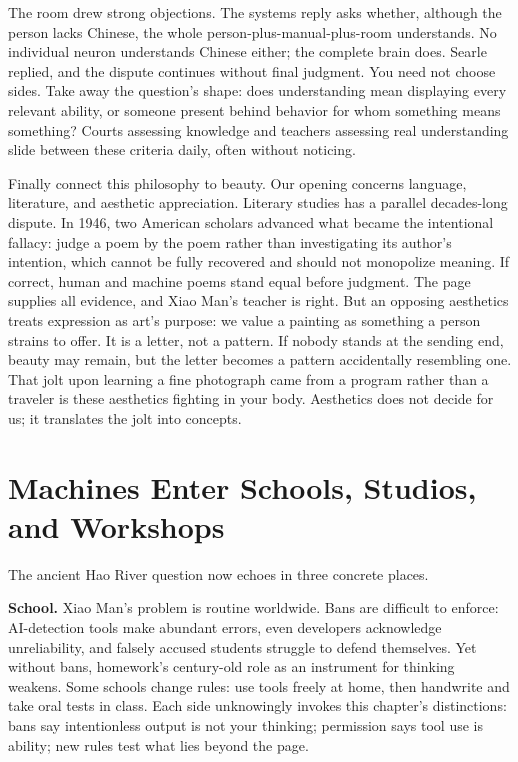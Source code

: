 The room drew strong objections. The systems reply asks whether, although the person lacks Chinese, the whole person-plus-manual-plus-room understands. No individual neuron understands Chinese either; the complete brain does. Searle replied, and the dispute continues without final judgment. You need not choose sides. Take away the question's shape: does understanding mean displaying every relevant ability, or someone present behind behavior for whom something means something? Courts assessing knowledge and teachers assessing real understanding slide between these criteria daily, often without noticing.

Finally connect this philosophy to beauty. Our opening concerns language, literature, and aesthetic appreciation. Literary studies has a parallel decades-long dispute. In 1946, two American scholars advanced what became the intentional fallacy: judge a poem by the poem rather than investigating its author's intention, which cannot be fully recovered and should not monopolize meaning. If correct, human and machine poems stand equal before judgment. The page supplies all evidence, and Xiao Man's teacher is right. But an opposing aesthetics treats expression as art's purpose: we value a painting as something a person strains to offer. It is a letter, not a pattern. If nobody stands at the sending end, beauty may remain, but the letter becomes a pattern accidentally resembling one. That jolt upon learning a fine photograph came from a program rather than a traveler is these aesthetics fighting in your body. Aesthetics does not decide for us; it translates the jolt into concepts.

\section[Machines in Schools, Studios, and Shops]{Machines Enter Schools, Studios, and Workshops}
The ancient Hao River question now echoes in three concrete places.

\textbf{School.} Xiao Man's problem is routine worldwide. Bans are difficult to enforce: AI-detection tools make abundant errors, even developers acknowledge unreliability, and falsely accused students struggle to defend themselves. Yet without bans, homework's century-old role as an instrument for thinking weakens. Some schools change rules: use tools freely at home, then handwrite and take oral tests in class. Each side unknowingly invokes this chapter's distinctions: bans say intentionless output is not your thinking; permission says tool use is ability; new rules test what lies beyond the page.

